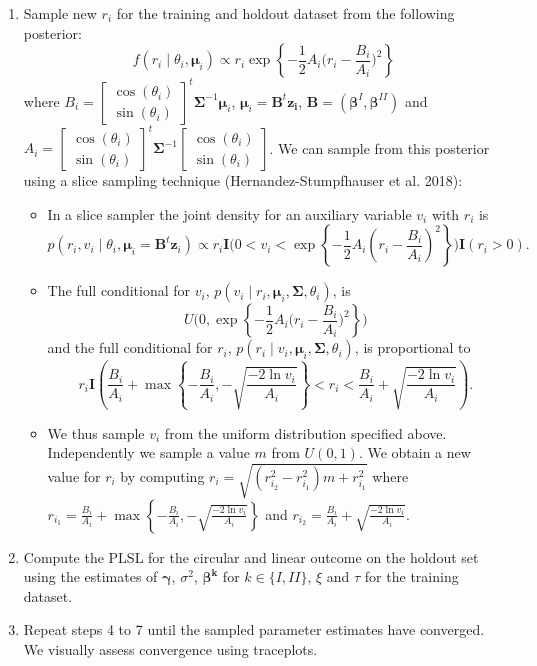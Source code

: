\documentclass[12pt,]{article}
\begin{document}
\begin{enumerate}
\item Sample new $r_i$ for the training and holdout dataset from the following posterior:
$$f(r_i \mid \theta_i, \boldsymbol{\mu}_i) \propto r_i \exp{\left\{-\frac{1}{2}A_i\bigg(r_i-\frac{B_i}{A_i}\bigg)^2\right\}}$$ 
where $B_i = \begin{bmatrix} \cos (\theta_i) \\ \sin (\theta_i)\end{bmatrix}^t\boldsymbol{\Sigma}^{-1}\boldsymbol{\mu}_i$, $\boldsymbol{\mu}_i = \boldsymbol{B}^t\boldsymbol{z_i}$, $\boldsymbol{B} = (\boldsymbol{\beta}^{I}, \boldsymbol{\beta}^{II})$ and $A_i = \begin{bmatrix} \cos (\theta_i) \\ \sin (\theta_i)\end{bmatrix}^t\boldsymbol{\Sigma}^{-1}\begin{bmatrix} \cos (\theta_i) \\ \sin (\theta_i)\end{bmatrix}$.
\noindent We can sample from this posterior using a slice sampling technique (Hernandez-Stumpfhauser et al. 2018):

\begin{itemize}
\item In a slice sampler the joint density for an auxiliary variable $v_{i}$ with $r_{i}$ is
$$p(r_{i}, v_{i}\mid \theta_{i}, \boldsymbol{\mu}_{i}=\boldsymbol{B}^t\boldsymbol{z}_{i}) \propto r_{i} \textbf{I}\bigg(0 < v_i < \exp\left\{ -\frac{1}{2} A_i\left(r_{i} - \frac{B_i}{A_i}\right)^2\right\}\bigg)\textbf{I}(r_i > 0).$$
\item The full conditional for $v_{i}$, $p(v_{i} \mid r_{i},\boldsymbol{\mu}_{i}, \boldsymbol{\Sigma}, \theta_{i})$, is
$$U\Bigg(0, \exp\left\{-\frac{1}{2}A_i\bigg(r_i -  \frac{B_{i}}{A_i}\bigg)^2\right\}\Bigg)$$
and the full conditional for $r_i$, $p(r_{i} \mid v_{i},\boldsymbol{\mu}_{i}, \boldsymbol{\Sigma}, \theta_{i})$, is proportional to
$$r_{i} \textbf{I}\left(\frac{B_i}{A_i} + \max\left\{-\frac{B_i}{A_i}, -\sqrt{\frac{-2\ln v_{i}}{A_i}}\right\} < r_{i} < \frac{B_i}{A_i} + \sqrt{\frac{-2\ln v_{i}}{A_i}}\right).$$
\item We thus sample $v_{i}$ from the uniform distribution specified above. Independently we sample a value $m$ from $U(0,1)$. We obtain a new value for $r_{i}$ by computing $r_{i} = \sqrt{(r_{i_{2}}^{2}-r_{i_{1}}^{2})m + r_{i_{1}}^{2}}$ where $r_{i_{1}}=\frac{B_i}{A_i} +\max\left\{-\frac{B_i}{A_i}, -\sqrt{\frac{-2\ln v_{i}}{A_i}}\right\}$ and $ r_{i_{2}}= \frac{B_i}{A_i} + \sqrt{\frac{-2\ln v_{i}}{A_i}}$.
\end{itemize}

\item Compute the PLSL for the circular and linear outcome on the holdout set using the estimates of $\boldsymbol{\gamma}$, $\sigma^2$, $\boldsymbol{\beta^{k}}$ for $k \in \{I,II\}$, $\xi$ and $\tau$ for the training dataset. 
\item Repeat steps 4 to 7 until the sampled parameter estimates have converged. We visually assess convergence using traceplots.
\end{enumerate}
\end{document}
